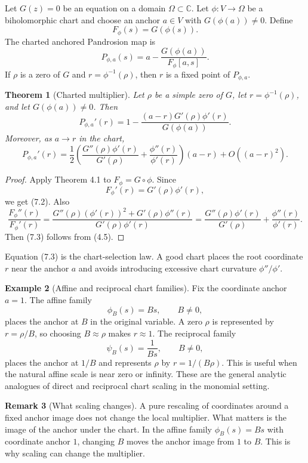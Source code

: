 \documentclass[11pt]{article}
\newtheorem{theorem}{Theorem}[section]
\theoremstyle{definition}
\newtheorem{remark}[theorem]{Remark}
\newtheorem{example}[theorem]{Example}
\newcommand{\C}{\mathbb{C}}
\begin{document}
Let $G(z)=0$ be an equation on a domain $\Omega\subset\C$.  Let $\phi:V\to\Omega$ be a biholomorphic chart and choose an anchor $a\in V$ with $G(\phi(a))\ne0$.  Define
\[
        F_\phi(s)=G(\phi(s)).
\]
The charted anchored Pandrosion map is
\[
        P_{\phi,a}(s)
        =a-\frac{G(\phi(a))}{F_\phi[a,s]}.
        \tag{7.1}
\]
If $\rho$ is a zero of $G$ and $r=\phi^{-1}(\rho)$, then $r$ is a fixed point of $P_{\phi,a}$.

\begin{theorem}[Charted multiplier]
Let $\rho$ be a simple zero of $G$, let $r=\phi^{-1}(\rho)$, and let $G(\phi(a))\ne0$.  Then
\[
        P_{\phi,a}'(r)
        =1-\frac{(a-r)G'(\rho)\phi'(r)}{G(\phi(a))}.
        \tag{7.2}
\]
Moreover, as $a\to r$ in the chart,
\[
        P_{\phi,a}'(r)
        =\frac{1}{2}
        \left(
            \frac{G''(\rho)\phi'(r)}{G'(\rho)}
            +\frac{\phi''(r)}{\phi'(r)}
        \right)(a-r)
        +O((a-r)^2).
        \tag{7.3}
\]
\end{theorem}

\begin{proof}
Apply Theorem 4.1 to $F_\phi=G\circ\phi$.  Since
\[
        F_\phi'(r)=G'(\rho)\phi'(r),
\]
we get (7.2).  Also
\[
        \frac{F_\phi''(r)}{F_\phi'(r)}
        =\frac{G''(\rho)(\phi'(r))^2+G'(\rho)\phi''(r)}{G'(\rho)\phi'(r)}
        =\frac{G''(\rho)\phi'(r)}{G'(\rho)}+\frac{\phi''(r)}{\phi'(r)}.
\]
Then (7.3) follows from (4.5).
\end{proof}

Equation (7.3) is the chart-selection law.  A good chart places the root coordinate $r$ near the anchor $a$ and avoids introducing excessive chart curvature $\phi''/\phi'$.

\begin{example}[Affine and reciprocal chart families]
Fix the coordinate anchor $a=1$.
The affine family
\[
        \phi_B(s)=Bs,
        \qquad B\ne0,
\]
places the anchor at $B$ in the original variable.  A zero $\rho$ is represented by $r=\rho/B$, so choosing $B\approx\rho$ makes $r\approx1$.
The reciprocal family
\[
        \psi_B(s)=\frac{1}{Bs},
        \qquad B\ne0,
\]
places the anchor at $1/B$ and represents $\rho$ by $r=1/(B\rho)$.  This is useful when the natural affine scale is near zero or infinity.  These are the general analytic analogues of direct and reciprocal chart scaling in the monomial setting.
\end{example}

\begin{remark}[What scaling changes]
A pure rescaling of coordinates around a fixed anchor image does not change the local multiplier.  What matters is the image of the anchor under the chart.  In the affine family $\phi_B(s)=Bs$ with coordinate anchor $1$, changing $B$ moves the anchor image from $1$ to $B$.  This is why scaling can change the multiplier.
\end{remark}
\end{document}
